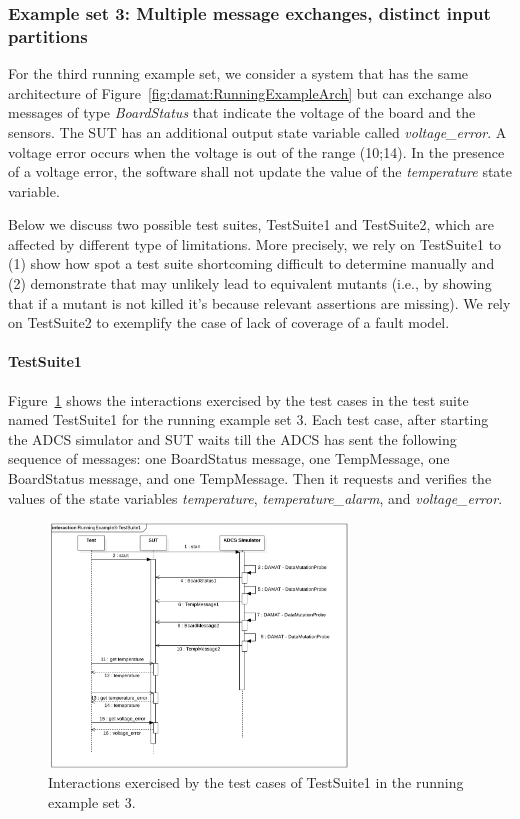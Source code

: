 \clearpage 
\subsubsection{Example set 3: Multiple message exchanges, distinct input partitions}
\label{sec:dataDriven:example:3}

For the third running example set, we consider a system that has the same architecture of  Figure~\ref{fig:damat:RunningExampleArch} but can exchange also messages of type \emph{BoardStatus} that indicate the voltage of the board and the sensors. The SUT has an additional output state variable called \emph{voltage\_error}. A voltage error occurs when the voltage is out of the range (10;14). In the presence of a voltage error, the software shall not update the value of the \emph{temperature} state variable.

Below we discuss two possible test suites, TestSuite1 and TestSuite2, which are affected by different type of limitations.
More precisely, we rely on TestSuite1 to (1) show how \APPR spot a test suite shortcoming difficult to determine manually and (2) demonstrate that \APPR may unlikely lead to equivalent mutants (i.e., by showing that if a mutant is not killed it's because relevant assertions are missing). We rely on TestSuite2 to exemplify the case of lack of coverage of a fault model.

\paragraph{TestSuite1}

Figure~\ref{fig:damat:RunningExample3Sequence} shows the interactions exercised by the test cases in the test suite named TestSuite1 for the running example set 3. Each test case, after starting the ADCS simulator and SUT waits till the ADCS has sent the following sequence of messages: one BoardStatus message, one TempMessage, one BoardStatus message, and one TempMessage. Then it requests and verifies the values of the state variables \emph{temperature}, \emph{temperature\_alarm}, and \emph{voltage\_error}.

\begin{figure}[tb]
\centering
\includegraphics[width=8cm]{damat/images/RunningExampleSequence3.png}
\caption{Interactions exercised by the test cases of TestSuite1 in the running example set 3.}
\label{fig:damat:RunningExample3Sequence}
\end{figure}

